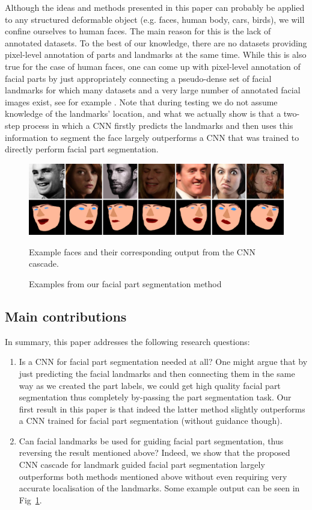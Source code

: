 Although the ideas and methods presented in this paper can probably be
applied to any structured deformable object (e.g. faces, human body,
cars, birds), we will confine ourselves to human faces. The main
reason for this is the lack of annotated datasets. To the best of our
knowledge, there are no datasets providing pixel-level annotation of
parts and landmarks at the same time. While this is also true for the
case of human faces, one can come up with pixel-level annotation of
facial parts by just appropriately connecting a pseudo-dense set of
facial landmarks for which many datasets and a very large number of
annotated facial images exist, see for example
\cite{sagonas2013semi}. Note that during testing we do not assume
knowledge of the landmarks' location, and what we actually show is
that a two-step process in which a CNN firstly predicts the landmarks
and then uses this information to segment the face largely outperforms
a CNN that was trained to directly perform facial part segmentation.

\begin{figure}
\centering
\includegraphics[width=\linewidth]{figs/sampler.png}
\caption{Examples from our facial part segmentation method}{Example
  faces and their corresponding output from the CNN cascade.}
\label{fig:sampler}
\end{figure}


\subsection{Main contributions}

In summary, this paper addresses the following research questions:
\begin{enumerate}
\item Is a CNN for facial part segmentation needed at all? One might
  argue that by just predicting the facial landmarks and then
  connecting them in the same way as we created the part labels, we
  could get high quality facial part segmentation thus completely
  by-passing the part segmentation task. Our first result in this
  paper is that indeed the latter method slightly outperforms a CNN
  trained for facial part segmentation (without guidance though).
\item Can facial landmarks be used for guiding facial part
  segmentation, thus reversing the result mentioned above? Indeed, we
  show that the proposed CNN cascade for landmark guided facial part
  segmentation largely outperforms both methods mentioned above
  without even requiring very accurate localisation of the
  landmarks. Some example output can be seen in Fig~\ref{fig:sampler}.
\end{enumerate}

